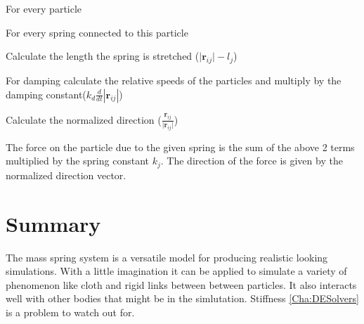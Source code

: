 \begin{list}{}{}
    \item{For every particle}
    \begin{list}{.}{}
        \item{For every spring connected to this particle}
        \begin{list}{..}{}
            \item{Calculate the length the spring is stretched ($\vert \mathbf{r}_{ij} \vert - l_j$)}                                    
            \item{For damping calculate the relative speeds of the particles and multiply by the damping constant($k_d\frac{d}{dt}\left|\mathbf{r}_{ij}\right|$)}                        
            \item{Calculate the normalized direction
            ($\frac{\mathbf{r}_{ij}}{\vert \mathbf{r}_{ij} \vert}$)}
            \item{The force on the particle due to the given spring is the sum 
            of the above 2 terms multiplied by the spring constant $k_j$. 
            The direction of the force is given by the normalized direction vector.}            
        \end{list}
    \end{list}    
\end{list}

\section{Summary}
The mass spring system is a versatile model for producing realistic looking
simulations. With a little imagination it can be applied to simulate a variety
of phenomenon like cloth and rigid links between between particles. It
also interacts well with other bodies that might be in the simlutation.
Stiffness \ref{Cha:DESolvers} is a problem to watch out for.
